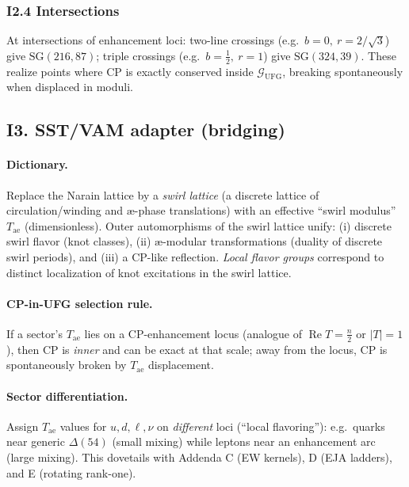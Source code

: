 \documentclass[11pt]{article}
\begin{document}
      \subsubsection*{I2.4 Intersections}
          At intersections of enhancement loci: two-line crossings (e.g.\ $b=0,\ r=2/\sqrt3$) give $\mathrm{SG}(216,87)$; triple crossings (e.g.\ $b=\tfrac12,\ r=1$) give $\mathrm{SG}(324,39)$. These realize points where CP is exactly conserved inside $\mathcal G_{\mathrm{UFG}}$, breaking spontaneously when displaced in moduli.

  \subsection*{I3. SST/VAM adapter (bridging)}

      \paragraph{Dictionary.}
          Replace the Narain lattice by a \emph{swirl lattice} (a discrete lattice of circulation/winding and \ae{}-phase translations) with an effective “swirl modulus” $T_{\text{ae}}$ (dimensionless). Outer automorphisms of the swirl lattice unify: (i) discrete swirl flavor (knot classes), (ii) \ae{}-modular transformations (duality of discrete swirl periods), and (iii) a CP-like reflection. \emph{Local flavor groups} correspond to distinct localization of knot excitations in the swirl lattice.

      \paragraph{CP-in-UFG selection rule.}
          If a sector’s $T_{\text{ae}}$ lies on a CP-enhancement locus (analogue of $\operatorname{Re}T=\tfrac{n}{2}$ or $|T|=1$), then CP is \emph{inner} and can be exact at that scale; away from the locus, CP is spontaneously broken by $T_{\text{ae}}$ displacement.

      \paragraph{Sector differentiation.}
          Assign $T_{\text{ae}}$ values for $u,d,\ell,\nu$ on \emph{different} loci (“local flavoring”): e.g.\ quarks near generic $\Delta(54)$ (small mixing) while leptons near an enhancement arc (large mixing). This dovetails with Addenda C (EW kernels), D (EJA ladders), and E (rotating rank-one).
\end{document}
